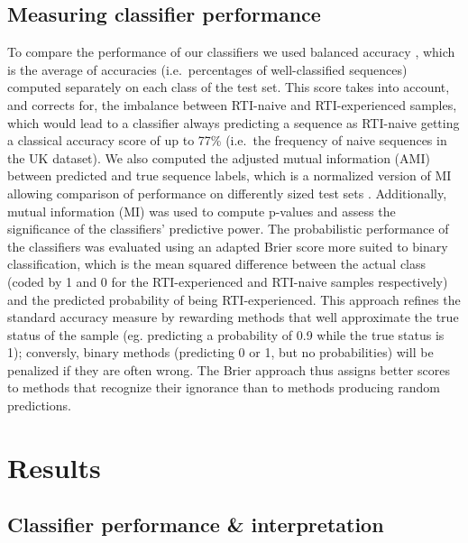 \documentclass[
  11pt,
  twoside,
  BCOR=10mm,
  listof=totoc]{scrbook}
\begin{document}
\hypertarget{measuring-classifier-performance}{%
\subsection{Measuring classifier performance}\label{measuring-classifier-performance}}

To compare the performance of our classifiers we used balanced accuracy
\autocite{brodersenBalancedAccuracyIts2010}, which is the average of accuracies
(i.e.~percentages of well-classified sequences) computed separately on
each class of the test set. This score takes into account, and corrects
for, the imbalance between RTI-naive and RTI-experienced samples, which
would lead to a classifier always predicting a sequence as RTI-naive
getting a classical accuracy score of up to 77\% (i.e.~the frequency of
naive sequences in the UK dataset). We also computed the adjusted mutual
information (AMI) between predicted and true sequence labels, which is a
normalized version of MI allowing comparison of performance on
differently sized test sets \autocite{vinhInformationTheoreticMeasures2010}.
Additionally, mutual information (MI) was used to compute p-values and
assess the significance of the classifiers' predictive power. The
probabilistic performance of the classifiers was evaluated using an
adapted Brier score \autocite{brierVERIFICATIONFORECASTSEXPRESSED1950} more
suited to binary classification, which is the mean squared difference
between the actual class (coded by 1 and 0 for the RTI-experienced and
RTI-naive samples respectively) and the predicted probability of being
RTI-experienced. This approach refines the standard accuracy measure by
rewarding methods that well approximate the true status of the sample
(eg. predicting a probability of 0.9 while the true status is 1);
conversly, binary methods (predicting 0 or 1, but no probabilities) will
be penalized if they are often wrong. The Brier approach thus assigns
better scores to methods that recognize their ignorance than to methods
producing random predictions.

\hypertarget{hiv-results}{%
\section{Results}\label{hiv-results}}

\hypertarget{classifier-performance-interpretation}{%
\subsection{Classifier performance \& interpretation}\label{classifier-performance-interpretation}}
\end{document}
